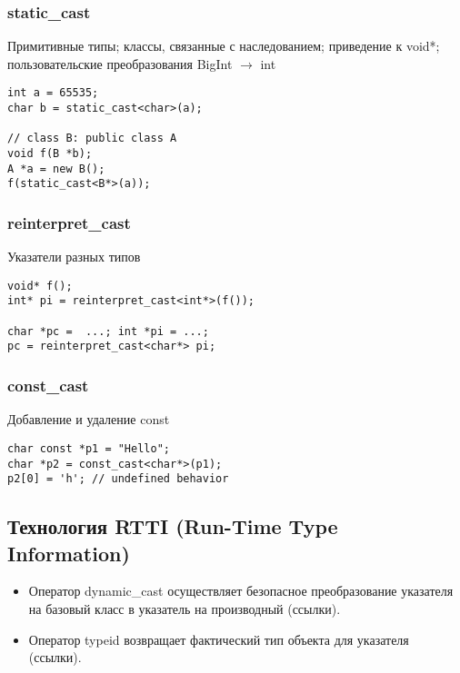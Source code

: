 \subsubsection{static\_cast} 
Примитивные типы; классы, связанные с наследованием; приведение к void*; пользовательские преобразования BigInt $\to$ int 
\begin{verbatim}
int a = 65535;
char b = static_cast<char>(a);

// class B: public class A
void f(B *b);
A *a = new B();
f(static_cast<B*>(a));
\end{verbatim}
\subsubsection{reinterpret\_cast}
Указатели разных типов
\begin{verbatim}
void* f();
int* pi = reinterpret_cast<int*>(f());

char *pc =  ...; int *pi = ...;
pc = reinterpret_cast<char*> pi;
\end{verbatim}

\subsubsection{const\_cast}
Добавление и удаление const
\begin{verbatim}
char const *p1 = "Hello";
char *p2 = const_cast<char*>(p1);
p2[0] = 'h'; // undefined behavior
\end{verbatim}
\subsection{Технология RTTI (Run-Time Type Information)}
\begin{itemize}[noitemsep]
    \item Оператор dynamic\_cast осуществляет безопасное преобразование указателя на базовый класс в указатель на производный (ссылки).
    \item Оператор typeid возвращает фактический тип объекта для указателя (ссылки).
\end{itemize}
